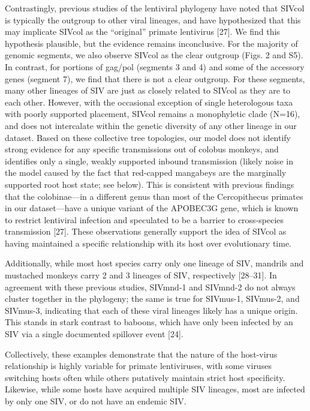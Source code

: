 Contrastingly, previous studies of the lentiviral phylogeny have noted that SIVcol is typically the outgroup to other viral lineages, and have hypothesized that this may implicate SIVcol as the “original” primate lentivirus [27].
We find this hypothesis plausible, but the evidence remains inconclusive.
For the majority of genomic segments, we also observe SIVcol as the clear outgroup (Figs. 2 and S5).
In contrast, for portions of gag/pol (segments 3 and 4) and some of the accessory genes (segment 7), we find that there is not a clear outgroup.
For these segments, many other lineages of SIV are just as closely related to SIVcol as they are to each other.
However, with the occasional exception of single heterologous taxa with poorly supported placement, SIVcol remains a monophyletic clade (N=16), and does not intercalate within the genetic diversity of any other lineage in our dataset.
Based on these collective tree topologies, our model does not identify strong evidence for any specific transmissions out of colobus monkeys, and identifies only a single, weakly supported inbound transmission (likely noise in the model caused by the fact that red-capped mangabeys are the marginally supported root host state; see below).
This is consistent with previous findings that the colobinae—in a different genus than most of the Cercopithecus primates in our dataset—have a unique variant of the APOBEC3G gene, which is known to restrict lentiviral infection and speculated to be a barrier to cross-species transmission [27].
These observations generally support the idea of SIVcol as having maintained a specific relationship with its host over evolutionary time.

Additionally, while most host species carry only one lineage of SIV, mandrils and mustached monkeys carry 2 and 3 lineages of SIV, respectively [28–31].
In agreement with these previous studies, SIVmnd-1 and SIVmnd-2 do not always cluster together in the phylogeny; the same is true for SIVmus-1, SIVmus-2, and SIVmus-3, indicating that each of these viral lineages likely has a unique origin.
This stands in stark contrast to baboons, which have only been infected by an SIV via a single documented spillover event [24].

Collectively, these examples demonstrate that the nature of the host-virus relationship is highly variable for primate lentiviruses, with some viruses switching hosts often while others putatively maintain strict host specificity.
Likewise, while some hosts have acquired multiple SIV lineages, most are infected by only one SIV, or do not have an endemic SIV.

